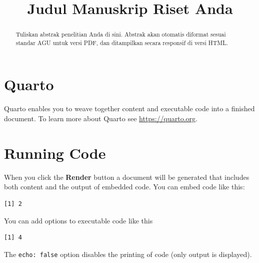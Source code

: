 \documentclass[
]{agujournal2019}
\begin{document}
\title{Judul Manuskrip Riset Anda}



\begin{abstract}
Tuliskan abstrak penelitian Anda di sini. Abstrak akan otomatis diformat
sesuai standar AGU untuk versi PDF, dan ditampilkan secara responsif di
versi HTML.
\end{abstract}





\section{Quarto}\label{quarto}

Quarto enables you to weave together content and executable code into a
finished document. To learn more about Quarto see
\url{https://quarto.org}.

\section{Running Code}\label{running-code}

When you click the \textbf{Render} button a document will be generated
that includes both content and the output of embedded code. You can
embed code like this:

\begin{verbatim}
[1] 2
\end{verbatim}

You can add options to executable code like this

\begin{verbatim}
[1] 4
\end{verbatim}

The \texttt{echo:\ false} option disables the printing of code (only
output is displayed).
\end{document}
